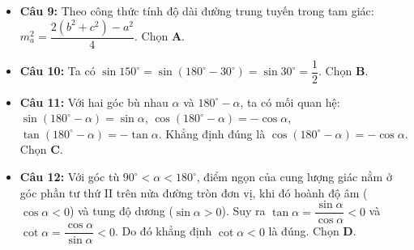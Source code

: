 \documentclass[12pt,a4paper]{article}
\begin{document}
\begin{itemize}[leftmargin=0.6cm, itemsep=3pt]
    \item \textbf{Câu 9:} Theo công thức tính độ dài đường trung tuyến trong tam giác:
    $m_a^2 = \dfrac{2(b^2 + c^2) - a^2}{4}$. Chọn \textbf{A}.
    \item \textbf{Câu 10:} Ta có $\sin 150^\circ = \sin(180^\circ - 30^\circ) = \sin 30^\circ = \dfrac{1}{2}$. Chọn \textbf{B}.
    \item \textbf{Câu 11:} Với hai góc bù nhau $\alpha$ và $180^\circ - \alpha$, ta có mối quan hệ:
    $\sin(180^\circ - \alpha) = \sin \alpha$, $\cos(180^\circ - \alpha) = -\cos \alpha$, $\tan(180^\circ - \alpha) = -\tan \alpha$. Khẳng định đúng là $\cos(180^\circ - \alpha) = -\cos \alpha$. Chọn \textbf{C}.
    \item \textbf{Câu 12:} Với góc tù $90^\circ < \alpha < 180^\circ$, điểm ngọn của cung lượng giác nằm ở góc phần tư thứ II trên nửa đường tròn đơn vị, khi đó hoành độ âm ($\cos \alpha < 0$) và tung độ dương ($\sin \alpha > 0$). Suy ra $\tan \alpha = \dfrac{\sin \alpha}{\cos \alpha} < 0$ và $\cot \alpha = \dfrac{\cos \alpha}{\sin \alpha} < 0$. Do đó khẳng định $\cot \alpha < 0$ là đúng. Chọn \textbf{D}.
\end{itemize}
\end{document}
